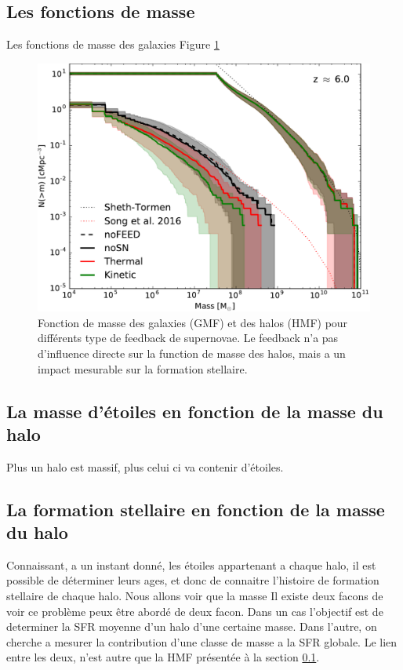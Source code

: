 \subsection{Les fonctions de masse}
\label{sec:hmf}
Les fonctions de masse des galaxies 
Figure \ref{fig:ghmf}

\begin{figure}
		\includegraphics[width=.95\linewidth]{img/03/ghmf.pdf}
        \caption{Fonction de masse des galaxies (GMF) et des halos (HMF) pour différents type de feedback de supernovae.
        Le feedback n'a pas d'influence directe sur la function de masse des halos, mais a un impact mesurable sur la formation stellaire.
 		\label{fig:ghmf}}
\end{figure}

\subsection{La masse d'étoiles en fonction de la masse du halo}
Plus un halo est massif, plus celui ci va contenir d'étoiles.



\subsection{La formation stellaire en fonction de la masse du halo}
\label{sec:sfr_halo}
Connaissant, a un instant donné, les étoiles appartenant a chaque halo, il est possible de déterminer leurs ages, et donc de connaitre l'histoire de formation stellaire de chaque halo.
Nous allons voir que la masse 
Il existe deux facons de voir 
ce problème peux être abordé de deux facon.
Dans un cas l'objectif est de determiner la SFR moyenne d'un halo d'une certaine masse.
Dans l'autre, on cherche a mesurer la contribution d'une classe de masse a la SFR globale.
Le lien entre les deux, n'est autre que la \ac{HMF} présentée à la section \ref{sec:hmf}.


